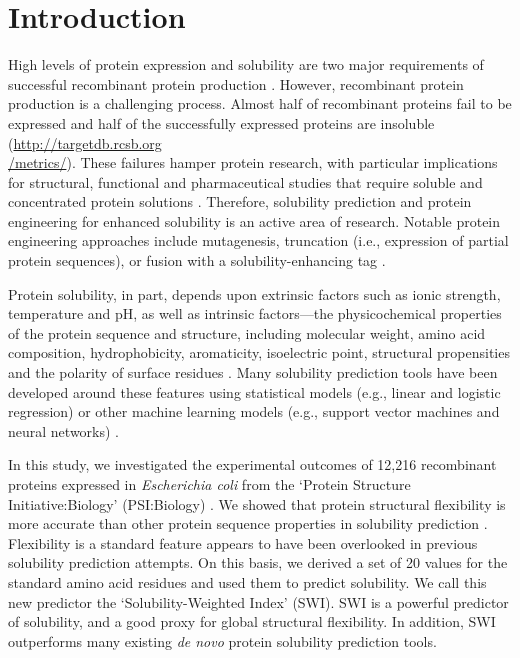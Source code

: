 \section{Introduction}

High levels of protein expression and solubility are two major requirements of successful recombinant protein production \citep{Esposito2006-tj}. However, recombinant protein production is a challenging process. Almost half of recombinant proteins fail to be expressed and half of the successfully expressed proteins are insoluble (\href{http://targetdb.rcsb.org/metrics/}{http://targetdb.rcsb.org\\/metrics/}). These failures hamper protein research, with particular implications for structural, functional and pharmaceutical studies that require soluble and concentrated protein solutions \citep{Kramer2012-wk, Hou2018-yd}. Therefore, solubility prediction and protein engineering for enhanced solubility is an active area of research. Notable protein engineering approaches include mutagenesis, truncation (i.e., expression of partial protein sequences), or fusion with a solubility-enhancing tag \citep{Waldo2003-ui, Esposito2006-tj, Trevino2007-on, Chan2010-mo, Kramer2012-wk, Costa2014-oe}.

Protein solubility, in part, depends upon extrinsic factors such as ionic strength, temperature and pH, as well as intrinsic factors—the physicochemical properties of the protein sequence and structure, including molecular weight, amino acid composition, hydrophobicity, aromaticity, isoelectric point, structural propensities and the polarity of surface residues \citep{Wilkinson1991-zp, Chiti2003-zk, Tartaglia2004-wm, Diaz2010-md}. Many solubility prediction tools have been developed around these features using statistical models (e.g., linear and logistic regression) or other machine learning models (e.g., support vector machines and neural networks) \citep{Hirose2013-nq, Habibi2014-jq, Hebditch2017-bg, Sormanni2017-lo, Heckmann2018-wb, Wu2019-nz, Yang2019-kd}. 

In this study, we investigated the experimental outcomes of 12,216 recombinant proteins expressed in \textit{Escherichia coli} from the ‘Protein Structure Initiative:Biology’ (PSI:Biology) \citep{Chen2004-cp, Acton2005-ng}. We showed that protein structural flexibility is more accurate than other protein sequence properties in solubility prediction \citep{vihinen1994accuracy, Craveur2015-wg}. Flexibility is a standard feature appears to have been overlooked in previous solubility prediction attempts. On this basis, we derived a set of 20 values for the standard amino acid residues and used them to predict solubility. We call this new predictor the ‘Solubility-Weighted Index’ (SWI). SWI is a powerful predictor of solubility, and a good proxy for global structural flexibility. In addition, SWI outperforms many existing \textit{de novo} protein solubility prediction tools.

